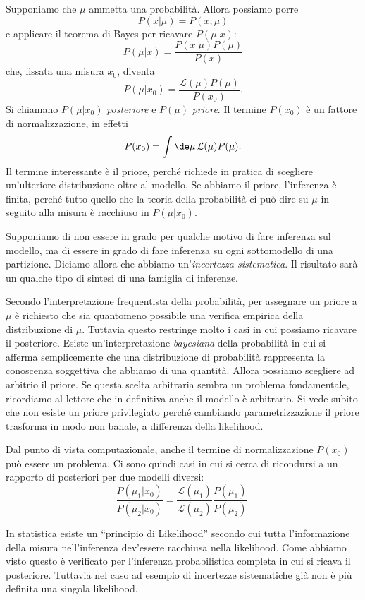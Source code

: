 Supponiamo che $\mu$ ammetta una probabilità. Allora possiamo porre
\begin{equation*}
	P(x|\mu) = P(x;\mu)
\end{equation*}
e applicare il teorema di Bayes per ricavare $P(\mu|x)$:
\begin{equation*}
	P(\mu|x) = \frac{P(x|\mu)P(\mu)}{P(x)}
\end{equation*}
che, fissata una misura $x_0$, diventa
\begin{equation*}
	P(\mu|x_0) = \frac{\mathcal L(\mu) P(\mu)}{P(x_0)}.
\end{equation*}
Si chiamano $P(\mu|x_0)$ \emph{posteriore} e $P(\mu)$ \emph{priore}.
Il termine $P(x_0)$ è un fattore di normalizzazione, in effetti
\begin{equation*}
	P(x_0) = \int \de \mu\, \mathcal L(\mu) P(\mu).
\end{equation*}
Il termine interessante è il priore, perché richiede in pratica di scegliere un'ulteriore distribuzione oltre al modello.
Se abbiamo il priore, l'inferenza è finita, perché tutto quello che la teoria della probabilità ci può dire su $\mu$ in seguito alla misura è racchiuso in $P(\mu|x_0)$.

Supponiamo di non essere in grado per qualche motivo di fare inferenza sul modello, ma di essere in grado di fare inferenza su ogni sottomodello di una partizione.
Diciamo allora che abbiamo un'\emph{incertezza sistematica}.
Il risultato sarà un qualche tipo di sintesi di una famiglia di inferenze.

Secondo l'interpretazione frequentista della probabilità,
per assegnare un priore a $\mu$ è richiesto che sia quantomeno possibile una verifica empirica della distribuzione di $\mu$.
Tuttavia questo restringe molto i casi in cui possiamo ricavare il posteriore.
Esiste un'interpretazione \emph{bayesiana} della probabilità in cui si afferma semplicemente che una distribuzione di probabilità rappresenta la conoscenza soggettiva che abbiamo di una quantità.
Allora possiamo scegliere ad arbitrio il priore.
Se questa scelta arbitraria sembra un problema fondamentale,
ricordiamo al lettore che in definitiva anche il modello è arbitrario.
Si vede subito che non esiste un priore privilegiato perché cambiando parametrizzazione il priore trasforma in modo non banale, a differenza della likelihood.

Dal punto di vista computazionale, anche il termine di normalizzazione $P(x_0)$ può essere un problema.
Ci sono quindi casi in cui si cerca di ricondursi a un rapporto di posteriori per due modelli diversi:
\begin{equation*}
	\frac{P(\mu_1|x_0)}{P(\mu_2|x_0)} = \frac{\mathcal L(\mu_1)}{\mathcal L(\mu_2)} \frac{P(\mu_1)}{P(\mu_2)}.
\end{equation*}

In statistica esiste un ``principio di Likelihood'' secondo cui tutta l'informazione della misura nell'inferenza dev'essere racchiusa nella likelihood.
Come abbiamo visto questo è verificato per l'inferenza probabilistica completa in cui si ricava il posteriore.
Tuttavia nel caso ad esempio di incertezze sistematiche già non è più definita una singola likelihood.
